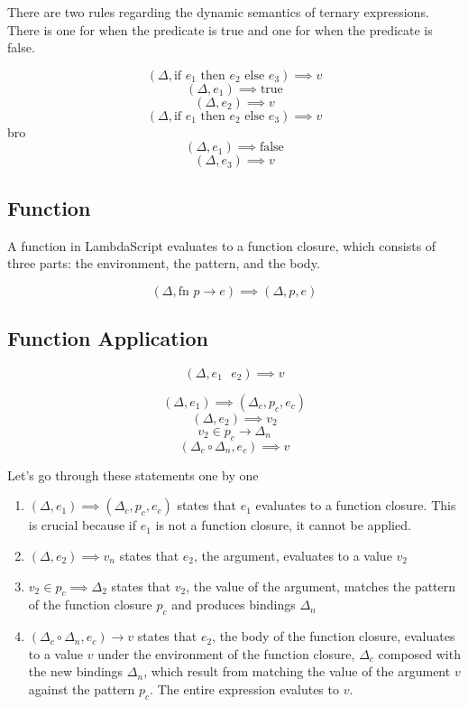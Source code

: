 \documentclass[titlepage]{article}
\begin{document}
There are two rules regarding the dynamic semantics of ternary expressions. There is one for when the predicate is true and one for when the predicate is false.


$$(\Delta, \text{if } e_1 \text{ then } e_2 \text{ else } e_3) \implies v$$
\noindent\makebox[\linewidth]{\rule{2.2in}{0.4pt}}
$$(\Delta, e_1) \implies \text{true}$$
$$(\Delta, e_2) \implies v$$
\noindent\makebox[\linewidth]{\rule{3in}{0.4pt}}
$$(\Delta, \text{if } e_1 \text{ then } e_2 \text{ else } e_3) \implies v$$
\noindent\makebox[\linewidth]{\rule{2.2in}{0.4pt}}bro
$$(\Delta, e_1) \implies \text{false}$$
$$(\Delta, e_3) \implies v$$

\subsection{Function}

A function in LambdaScript evaluates to a function closure, which consists of three parts: the environment, the pattern, and the body.

$$(\Delta, \text{fn } p \rightarrow e) \implies (\Delta, p, e)$$

\subsection{Function Application}

$$(\Delta, e_1 \text{ } e_2) \implies v$$
\noindent\makebox[\linewidth]{\rule{1.2in}{0.4pt}}

$$(\Delta, e_1) \implies (\Delta_c, p_c, e_c)$$
$$(\Delta, e_2) \implies v_2$$
$$v_2 \in p_c \rightarrow \Delta_n$$
$$(\Delta_c \circ \Delta_n, e_c) \implies v$$

Let's go through these statements one by one

\begin{enumerate}
\item $(\Delta, e_1) \implies (\Delta_c, p_c, e_c)$ states that $e_1$ evaluates to a function closure. This is crucial because if $e_1$ is not a function closure, it cannot be applied.
\item $(\Delta, e_2) \implies v_n$ states that $e_2$, the argument, evaluates to a value $v_2$
\item $v_2 \in p_c \implies \Delta_2$ states that $v_2$, the value of the argument, matches the pattern of the function closure $p_c$ and produces bindings $\Delta_n$
\item $(\Delta_c \circ \Delta_n, e_c) \rightarrow v$ states that $e_2$, the body of the function closure, evaluates to a value $v$ under the environment of the function closure, $\Delta_c$ composed with the new bindings $\Delta_n$, which result from matching the value of the argument $v$ against the pattern $p_c$. The entire expression evalutes to $v$.

\end{enumerate}
\end{document}
